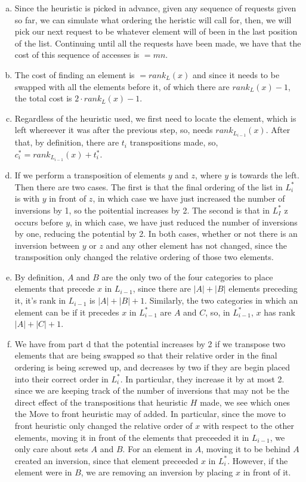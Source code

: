 \documentclass{article}
\begin{document}
\begin{enumerate}[a.]
\item 
Since the heuristic is picked in advance, given any sequence of requests given so far, we can simulate what ordering the heristic will call for, then, we will pick our next request to be whatever element will of been in the last position of the list. Continuing until all the requests have been made, we have that the cost of this sequence of accesses is $=mn$.

\item
The cost of finding an element is $=rank_L(x)$ and since it needs to be swapped with all the elements before it, of which there are $rank_L(x)-1$, the total cost is $2\cdot rank_L(x)-1$.

\item
Regardless of the heuristic used, we first need to locate the element, which is left whereever it was after the previous step, so, needs $rank_{L_{i-1}}(x)$. After that, by definition, there are $t_i$ transpositions made, so, $c_i^* = rank_{L_{i-1}}(x) + t_i^*$.

\item
If we perform a transposition of elements $y$ and $z$, where $y$ is towards the left. Then there are two cases. The first is that the final ordering of the list in $L_i^*$ is with $y$ in front of $z$, in which case we have just increased the number of inversions by 1, so the poitential increases by 2. The second is that in $L_I^*$ z occurs before $y$, in which case, we have just reduced the number of inversions by one, reducing the potential by 2. In both cases, whether or not there is an inversion between $y$ or $z$ and any other element has not changed, since the transposition only changed the relative ordering of those two elements.

\item
By definition, $A$ and $B$ are the only two of the four categories to place elements that precede $x$ in $L_{i-1}$, since there are $|A|+|B|$ elements preceding it, it's rank in $L_{i-1}$ is $|A|+|B|+1$. Similarly, the two categories in which an element can be if it precedes $x$ in $L_{i-1}^*$ are $A$ and $C$, so, in $L_{i-1}^*$, $x$ has rank $|A|+|C|+1$.

\item
We have from part d that the potential increases by 2 if we transpose two elements that are being swapped so that their relative order in the final ordering is being screwed up, and decreases by two if they are begin placed into their correct order in $L_i^*$. In particular, they increase it by at most 2. since we are keeping track of the number of inversions that may not be the direct effect of the transpositions that heuristic $H$ made, we see which ones the Move to front heuristic may of added. In particular, since the move to front heuristic only changed the relative order of $x$ with respect to the other elements, moving it in front of the elements that preceeded it in $L_{i-1}$, we only care about sets $A$ and $B$. For an element in $A$, moving it to be behind $A$ created an inversion, since that element preceeded $x$ in $L_i^*$. However, if the element were in $B$, we are removing an inversion by placing $x$ in front of it.


\end{enumerate}
\end{document}
